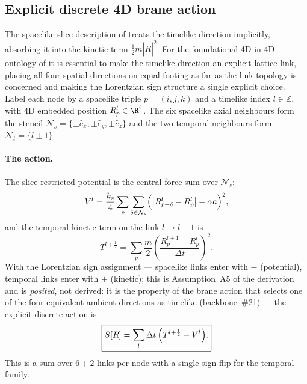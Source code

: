 \subsection{Explicit discrete 4D brane action}
\label{subsec:discrete-4d-action}

The spacelike-slice description of  treats the timelike direction implicitly, absorbing it into the kinetic term $\tfrac12 m |\dot{R}|^2$.
For the foundational 4D-in-4D ontology of  it is essential to make the timelike direction an explicit lattice link, placing all four spatial directions on equal footing as far as the link topology is concerned and making the Lorentzian sign structure a single explicit choice.
Label each node by a spacelike triple $p=(i,j,k)$ and a timelike index $l\in\mathbb{Z}$, with 4D embedded position $R_p^l\in\R^4$.
The six spacelike axial neighbours form the stencil $\mathcal{N}_s=\{\pm\hat{e}_x,\pm\hat{e}_y,\pm\hat{e}_z\}$ and the two temporal neighbours form $\mathcal{N}_t=\{l\pm 1\}$.

\paragraph{The action.}
The slice-restricted potential is the central-force sum over $\mathcal{N}_s$:
\begin{equation}
  V^l = \frac{k_s}{4}\sum_{p}\sum_{\delta\in\mathcal{N}_s}
        \Bigl(\bigl|R_{p+\delta}^l - R_p^l\bigr| - \alpha a\Bigr)^2,
  \label{eq:slice-potential}
\end{equation}
and the temporal kinetic term on the link $l\to l+1$ is
\begin{equation}
  T^{l+\frac{1}{2}} = \sum_{p}\frac{m}{2}
        \left(\frac{R_p^{l+1}-R_p^l}{\Delta t}\right)^{\!2}.
  \label{eq:temporal-kinetic}
\end{equation}
With the Lorentzian sign assignment --- spacelike links enter with $-$ (potential), temporal links enter with $+$ (kinetic); this is Assumption~A5 of the derivation and is \emph{posited}, not derived: it is the property of the brane action that selects one of the four equivalent ambient directions as timelike (backbone~\#21) --- the explicit discrete action is
\begin{equation}
  \boxed{
  S[R] = \sum_l \Delta t\,\Bigl(T^{l+\frac{1}{2}} - V^l\Bigr).
  }
  \label{eq:discrete-4d-action}
\end{equation}
This is a sum over $6+2$ links per node with a single sign flip for the temporal family.

